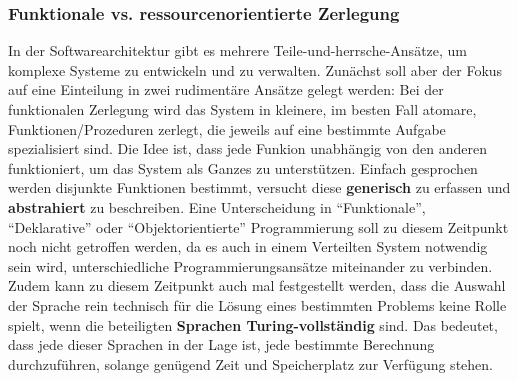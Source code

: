 \documentclass[../vs-script-first-v01.tex]{subfiles}
\begin{document}
\subsubsection{Funktionale vs. ressourcenorientierte Zerlegung}

In der Softwarearchitektur gibt es mehrere Teile-und-herrsche-Ansätze, um komplexe Systeme zu entwickeln und zu verwalten. Zunächst soll aber der Fokus auf eine Einteilung in zwei rudimentäre Ansätze gelegt werden:
Bei der funktionalen Zerlegung wird das System in kleinere, im besten Fall atomare, Funktionen/Prozeduren zerlegt, die jeweils auf eine bestimmte Aufgabe spezialisiert sind. Die Idee ist, dass jede Funkion unabhängig von den anderen funktioniert, um das System als Ganzes zu unterstützen. 
Einfach gesprochen werden disjunkte Funktionen bestimmt, versucht diese \textbf{generisch} zu erfassen und \textbf{abstrahiert} zu beschreiben. Eine Unterscheidung in \enquote{Funktionale}, \enquote{Deklarative} oder \enquote{Objektorientierte} Programmierung soll zu diesem Zeitpunkt noch nicht getroffen werden, da es auch in einem Verteilten System notwendig sein wird, unterschiedliche Programmierungsansätze miteinander zu verbinden. 
Zudem kann zu diesem Zeitpunkt auch mal festgestellt werden, dass die Auswahl der Sprache rein technisch für die Lösung eines bestimmten Problems keine Rolle spielt, wenn die beteiligten \textbf{Sprachen Turing-vollständig} sind. Das bedeutet, dass jede dieser Sprachen in der Lage ist, jede bestimmte Berechnung durchzuführen, solange genügend Zeit und Speicherplatz zur Verfügung stehen.
\end{document}
